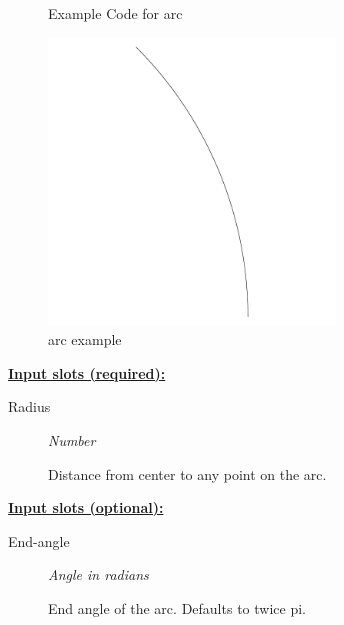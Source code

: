 \documentclass [11pt]{book}
\begin{document}
\begin{itemize}
\begin{figure}
\caption{Example Code for arc}

\label{fig:example-code-arc}

\end{figure}

\begin{figure}
\begin{center}
\includegraphics[width=3in,height=3in]{../images/example-arc.pdf}
\end{center}

\caption{arc example}

\label{fig:arc}

\end{figure}





\textbf{
\underline{Input slots (required):}}

\begin{description}

\item [Radius]
\emph{Number}

 Distance from center to any point on the arc.




\end{description}






\textbf{
\underline{Input slots (optional):}}

\begin{description}

\item [End-angle]
\emph{Angle in radians}

 End angle of the arc. Defaults to twice pi.





\end{description}
\end{itemize}
\end{document}
